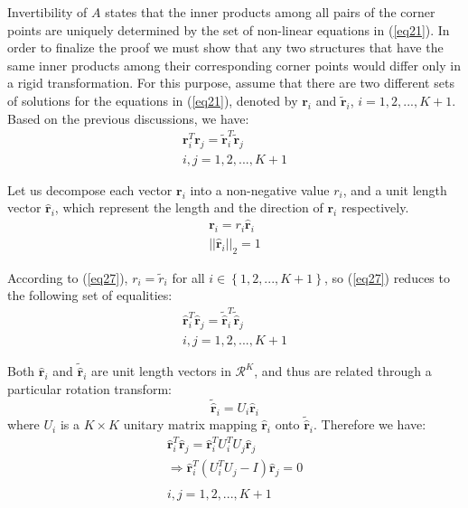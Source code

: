 \documentclass[10pt,journal,cspaper,compsoc]{IEEEtran}
\begin{document}
Invertibility of $A$ states that the inner products among all pairs of the corner points are uniquely determined by the set of non-linear equations in (\ref{eq21}). In order to finalize the proof we must show that any two structures that have the same inner products among their corresponding corner points would differ only in a rigid transformation. For this purpose, assume that there are two different sets of solutions for the equations in (\ref{eq21}), denoted by $\boldsymbol{r}_i$ and $\tilde{\boldsymbol{r}}_i$, $i=1,2,...,K+1$. Based on the previous discussions, we have:
\begin{gather}
\label{eq27}
\boldsymbol{r}_i^T\boldsymbol{r}_j=\tilde{\boldsymbol{r}}_i^T\tilde{\boldsymbol{r}}_j \\
i,j=1,2,...,K+1 \nonumber
\end{gather}

Let us decompose each vector $\boldsymbol{r}_i$ into a non-negative value $r_i$, and a unit length vector $\hat{\boldsymbol{r}}_i$, which represent the length and the direction of $\boldsymbol{r}_i$ respectively.
\begin{gather}
\label{eq28}
\boldsymbol{r}_i=r_i\hat{\boldsymbol{r}}_{i}\\
||\hat{\boldsymbol{r}}_i||_2=1 \nonumber
\end{gather}

According to (\ref{eq27}), $r_i=\tilde{r}_i$ for all $i\in\left\{1,2,...,K+1\right\}$, so (\ref{eq27}) reduces to the following set of equalities:
\begin{gather}
\label{eq29}
\hat{\boldsymbol{r}}_i^T\hat{\boldsymbol{r}}_j=\tilde{\hat{{\boldsymbol{r}}}}_i^T\tilde{\hat{\boldsymbol{r}}}_j \\
i,j=1,2,...,K+1 \nonumber
\end{gather}

Both $\hat{\boldsymbol{r}}_i$ and $\tilde{\hat{{\boldsymbol{r}}}}_i$ are unit length vectors in $\mathcal{R}^K$, and thus are related through a particular rotation transform:
\begin{equation}
\label{eq30}
\tilde{\hat{{\boldsymbol{r}}}}_i=U_i\hat{\boldsymbol{r}}_i
\end{equation}
where $U_i$ is a $K\times K$ unitary matrix mapping $\hat{\boldsymbol{r}}_i$ onto $\tilde{\hat{\boldsymbol{r}}}_i$. Therefore we have:
\begin{gather}
\label{eq31}
\hat{\boldsymbol{r}}_i^T\hat{\boldsymbol{r}}_j=\hat{\boldsymbol{r}}_i^{T}U_i^{T}U_j\hat{\boldsymbol{r}}_j \\
\Rightarrow 
\hat{\boldsymbol{r}}_i^{T}\left(U_i^{T}U_j-I\right)\hat{\boldsymbol{r}}_j=0 \nonumber \\
\nonumber \\
i,j=1,2,...,K+1 \nonumber
\end{gather}
\end{document}
